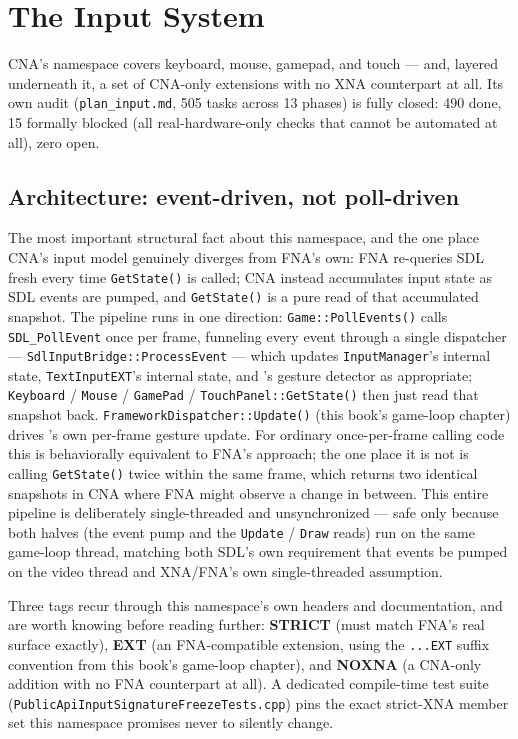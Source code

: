 \chapter{The Input System}
\label{ch:input-system}

CNA's  namespace covers keyboard, mouse, gamepad,
and touch --- and, layered underneath it, a set of CNA-only extensions with no XNA
counterpart at all. Its own audit (\texttt{plan\_input.md}, 505 tasks across 13 phases) is
fully closed: 490 done, 15 formally blocked (all real-hardware-only checks that cannot be
automated at all), zero open.

\section{Architecture: event-driven, not poll-driven}

The most important structural fact about this namespace, and the one place CNA's input
model genuinely diverges from FNA's own: FNA re-queries SDL fresh every time
\texttt{GetState()} is called; CNA instead accumulates input state as SDL events are pumped,
and \texttt{GetState()} is a pure read of that accumulated snapshot. The pipeline runs in one
direction: \texttt{Game::PollEvents()} calls \texttt{SDL\_PollEvent} once per frame, funneling
every event through a single dispatcher --- \texttt{SdlInputBridge::ProcessEvent} --- which
updates \texttt{InputManager}'s internal state, \texttt{TextInputEXT}'s internal state, and
's gesture detector as appropriate; \texttt{Keyboard} / \texttt{Mouse} /
\texttt{GamePad} / \texttt{TouchPanel::GetState()} then just read that snapshot back.
\texttt{FrameworkDispatcher::Update()} (this book's game-loop chapter) drives
's own per-frame gesture update. For ordinary once-per-frame calling
code this is behaviorally equivalent to FNA's approach; the one place it is not is calling
\texttt{GetState()} twice within the same frame, which returns two identical snapshots in
CNA where FNA might observe a change in between. This entire pipeline is deliberately
single-threaded and unsynchronized --- safe only because both halves (the event pump and the
\texttt{Update} / \texttt{Draw} reads) run on the same game-loop thread, matching both SDL's own
requirement that events be pumped on the video thread and XNA/FNA's own single-threaded
assumption.

Three tags recur through this namespace's own headers and documentation, and are worth
knowing before reading further: \textbf{STRICT} (must match FNA's real surface exactly),
\textbf{EXT} (an FNA-compatible extension, using the \texttt{...EXT} suffix convention from
this book's game-loop chapter), and \textbf{NOXNA} (a CNA-only addition with no FNA counterpart
at all). A dedicated compile-time test suite (\texttt{PublicApiInputSignatureFreezeTests.cpp})
pins the exact strict-XNA member set this namespace promises never to silently change.


